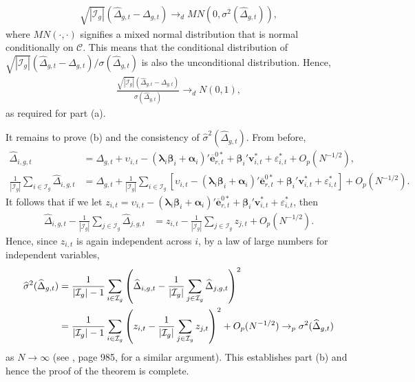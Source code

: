 \documentclass[12pt,fleqn]{article}
\def\*#1{\mathbf{#1}}
\def\+#1{\boldsymbol{#1}}
\begin{document}
\begin{align}
\sqrt{|\mathcal{I}_g|}(\widehat \Delta_{g,t} - \Delta_{g,t}) \to_d MN(0, \sigma^2(\widehat \Delta_{g,t}) ),
\end{align}
where $MN(\cdot,\cdot)$ signifies a mixed normal distribution that is normal conditionally on $\mathcal{C}$. This means that the conditional distribution of $\sqrt{|\mathcal{I}_g|}(\widehat \Delta_{g,t} - \Delta_{g,t})/\sigma(\widehat \Delta_{g,t})$ is also the unconditional distribution. Hence,
\begin{align}
\frac{\sqrt{|\mathcal{I}_g|}(\widehat \Delta_{g,t} - \Delta_{g,t})}{\sigma(\widehat \Delta_{g,t})} \to_d N(0, 1),
\end{align}
as required for part (a).

It remains to prove (b) and the consistency of $\widehat \sigma^2(\widehat \Delta_{g,t})$. From before,
\begin{align}
\widehat \Delta_{i,g,t} & = \Delta_{g,t} + \upsilon_{i,t} - (\+\lambda_i\+\beta_i + \+\alpha_i)'\overline{\*e}_{r,t}^{0\ast} + \+\beta_i'\*v_{i,t}^* + \varepsilon_{i,t}^* + O_p(N^{-1/2}), \\
\frac{1}{|\mathcal{I}_g|}\sum_{i\in \mathcal{I}_g} \widehat \Delta_{i,g,t} & = \Delta_{g,t}+ \frac{1}{|\mathcal{I}_g|}\sum_{i\in \mathcal{I}_g} [\upsilon_{i,t} - (\+\lambda_i\+\beta_i + \+\alpha_i)'\overline{\*e}_{r,t}^{0\ast} + \+\beta_i'\*v_{i,t}^* + \varepsilon_{i,t}^*] + O_p(N^{-1/2}).
\end{align}
It follows that if we let $z_{i,t} = \upsilon_{i,t} - (\+\lambda_i\+\beta_i + \+\alpha_i)'\overline{\*e}_{r,t}^{0\ast} + \+\beta_i'\*v_{i,t}^* + \varepsilon_{i,t}^*$, then
\begin{align}
\widehat \Delta_{i,g,t}  - \frac{1}{|\mathcal{I}_g|}\sum_{j \in \mathcal{I}_g} \widehat \Delta_{j,g,t} & = z_{i,t}  - \frac{1}{|\mathcal{I}_g|}\sum_{j\in \mathcal{I}_g} z_{j,t} + O_p(N^{-1/2}).
\end{align}
Hence, since $z_{i,t}$ is again independent across $i$, by a law of large numbers for independent variables,
\begin{align}
\widehat \sigma^2(\widehat \Delta_{g,t}) & = \frac{1}{|\mathcal{I}_g|-1}\sum_{i\in \mathcal{I}_g}\left(\widehat \Delta_{i,g,t}  - \frac{1}{|\mathcal{I}_g|}\sum_{j\in \mathcal{I}_g} \widehat \Delta_{j,g,t}\right)^2 \notag\\
& = \frac{1}{|\mathcal{I}_g|-1} \sum_{i\in \mathcal{I}_g} \left(z_{i,t}  - \frac{1}{|\mathcal{I}_g|} \sum_{j \in \mathcal{I}_g} z_{j,t}\right)^2 + O_p(N^{-1/2}) \to_p \sigma^2(\widehat \Delta_{g,t})
\end{align}
as $N\to\infty$ (see \citealp{pesaran2006estimation}, page 985, for a similar argument). This establishes part (b) and hence the proof of the theorem is complete.
\end{document}
